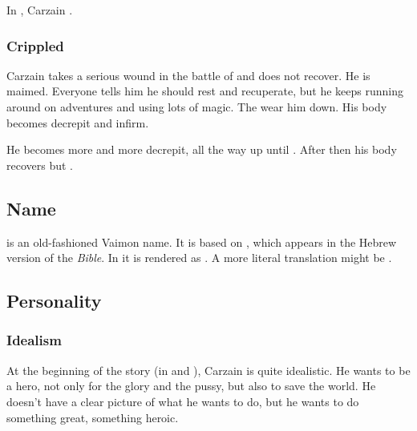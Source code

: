 In \emph{\CarzainWithRedcorBook{}}, Carzain . 





\subsubsection{Crippled}
Carzain takes a serious wound in the battle of \Forclin and does not recover. 
He is maimed.
Everyone tells him he should rest and recuperate, but he keeps running around on adventures and using lots of magic. 
The \qliphoth wear him down.
His body becomes decrepit and infirm.

He becomes more and more decrepit, all the way up until . 
After then his body recovers but .









\subsection{Name}
\quo{\Shireyo} is an old-fashioned Vaimon name. 
It is based on , which appears in the Hebrew version of the \emph{Bible}. 
In \cite[Isaiah 14:12]{KingJamesBible} it is rendered as . 
A more literal translation might be .









\subsection{Personality}





\subsubsection{Idealism}
At the beginning of the story (in \emph{\TwilightAngelRemember{}} and \emph{\CarzainWithRedcorBook{}}), Carzain is quite idealistic. He wants to be a hero, not only for the glory and the pussy, but also to save the world. He doesn't have a clear picture of what he wants to do, but he wants to do something great, something heroic. 

